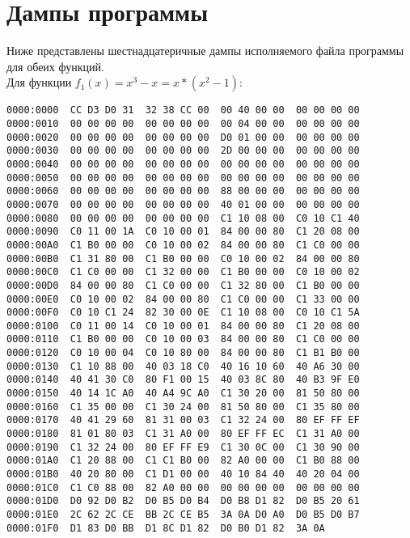 \documentclass[12pt,a4paper,oneside]{report}
\begin{document}
\section{Дампы программы}
Ниже представлены шестнадцатеричные дампы исполняемого файла программы для обеих функций.
\\Для функции $f_1(x)=x^3-x=x*(x^2-1)$:
\begin{verbatim}
0000:0000  CC D3 D0 31  32 38 CC 00  00 40 00 00  00 00 00 00
0000:0010  00 00 00 00  00 00 00 00  00 04 00 00  00 00 00 00
0000:0020  00 00 00 00  00 00 00 00  D0 01 00 00  00 00 00 00
0000:0030  00 00 00 00  00 00 00 00  2D 00 00 00  00 00 00 00
0000:0040  00 00 00 00  00 00 00 00  00 00 00 00  00 00 00 00
0000:0050  00 00 00 00  00 00 00 00  00 00 00 00  00 00 00 00
0000:0060  00 00 00 00  00 00 00 00  88 00 00 00  00 00 00 00
0000:0070  00 00 00 00  00 00 00 00  40 01 00 00  00 00 00 00
0000:0080  00 00 00 00  00 00 00 00  C1 10 08 00  C0 10 C1 40
0000:0090  C0 11 00 1A  C0 10 00 01  84 00 00 80  C1 20 08 00
0000:00A0  C1 B0 00 00  C0 10 00 02  84 00 00 80  C1 C0 00 00
0000:00B0  C1 31 80 00  C1 B0 00 00  C0 10 00 02  84 00 00 80
0000:00C0  C1 C0 00 00  C1 32 00 00  C1 B0 00 00  C0 10 00 02
0000:00D0  84 00 00 80  C1 C0 00 00  C1 32 80 00  C1 B0 00 00
0000:00E0  C0 10 00 02  84 00 00 80  C1 C0 00 00  C1 33 00 00
0000:00F0  C0 10 C1 24  82 30 00 0E  C1 10 08 00  C0 10 C1 5A
0000:0100  C0 11 00 14  C0 10 00 01  84 00 00 80  C1 20 08 00
0000:0110  C1 B0 00 00  C0 10 00 03  84 00 00 80  C1 C0 00 00
0000:0120  C0 10 00 04  C0 10 80 00  84 00 00 80  C1 B1 B0 00
0000:0130  C1 10 88 00  40 03 18 C0  40 16 10 60  40 A6 30 00
0000:0140  40 41 30 C0  80 F1 00 15  40 03 8C 80  40 B3 9F E0
0000:0150  40 14 1C A0  40 A4 9C A0  C1 30 20 00  81 50 80 00
0000:0160  C1 35 00 00  C1 30 24 00  81 50 80 00  C1 35 80 00
0000:0170  40 41 29 60  81 31 00 03  C1 32 24 00  80 EF FF EF
0000:0180  81 01 80 03  C1 31 A0 00  80 EF FF EC  C1 31 A0 00
0000:0190  C1 32 24 00  80 EF FF E9  C1 30 0C 00  C1 30 90 00
0000:01A0  C1 20 88 00  C1 C1 B0 00  82 A0 00 00  C1 B0 88 00
0000:01B0  40 20 80 00  C1 D1 00 00  40 10 84 40  40 20 04 00
0000:01C0  C1 C0 88 00  82 A0 00 00  00 00 00 00  00 00 00 00
0000:01D0  D0 92 D0 B2  D0 B5 D0 B4  D0 B8 D1 82  D0 B5 20 61
0000:01E0  2C 62 2C CE  BB 2C CE B5  3A 0A D0 A0  D0 B5 D0 B7
0000:01F0  D1 83 D0 BB  D1 8C D1 82  D0 B0 D1 82  3A 0A
\end{verbatim}
\end{document}
